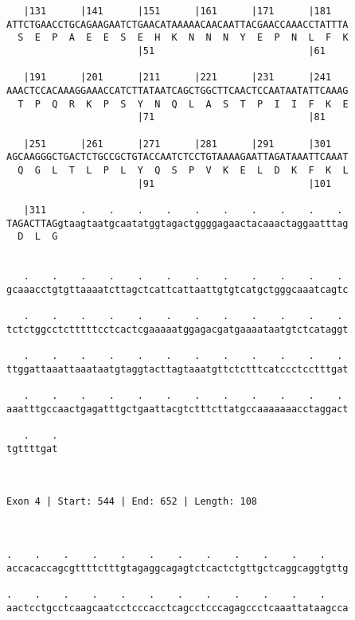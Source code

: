 \documentclass{article}
\begin{document}
\begin{Verbatim}
   |131      |141      |151      |161      |171      |181   
ATTCTGAACCTGCAGAAGAATCTGAACATAAAAACAACAATTACGAACCAAACCTATTTA
  S  E  P  A  E  E  S  E  H  K  N  N  N  Y  E  P  N  L  F  K
                       |51                           |61    
  
   |191      |201      |211      |221      |231      |241   
AAACTCCACAAAGGAAACCATCTTATAATCAGCTGGCTTCAACTCCAATAATATTCAAAG
  T  P  Q  R  K  P  S  Y  N  Q  L  A  S  T  P  I  I  F  K  E
                       |71                           |81    
  
   |251      |261      |271      |281      |291      |301   
AGCAAGGGCTGACTCTGCCGCTGTACCAATCTCCTGTAAAAGAATTAGATAAATTCAAAT
  Q  G  L  T  L  P  L  Y  Q  S  P  V  K  E  L  D  K  F  K  L
                       |91                           |101   
  
   |311      .    .    .    .    .    .    .    .    .    . 
TAGACTTAGgtaagtaatgcaatatggtagactggggagaactacaaactaggaatttag
  D  L  G                                                   
                                                            
  
   .    .    .    .    .    .    .    .    .    .    .    . 
gcaaacctgtgttaaaatcttagctcattcattaattgtgtcatgctgggcaaatcagtc
                                                            
   .    .    .    .    .    .    .    .    .    .    .    . 
tctctggcctctttttcctcactcgaaaaatggagacgatgaaaataatgtctcataggt
                                                            
   .    .    .    .    .    .    .    .    .    .    .    . 
ttggattaaattaaataatgtaggtacttagtaaatgttctctttcatccctcctttgat
                                                            
   .    .    .    .    .    .    .    .    .    .    .    . 
aaatttgccaactgagatttgctgaattacgtctttcttatgccaaaaaaacctaggact
                                                            
   .    .
tgttttgat
         
         
 
Exon 4 | Start: 544 | End: 652 | Length: 108



.    .    .    .    .    .    .    .    .    .    .    .    
accacaccagcgttttctttgtagaggcagagtctcactctgttgctcaggcaggtgttg
                                                            
.    .    .    .    .    .    .    .    .    .    .    .    
aactcctgcctcaagcaatcctcccacctcagcctcccagagccctcaaattataagcca
                                                            

\end{Verbatim}
\end{document}
